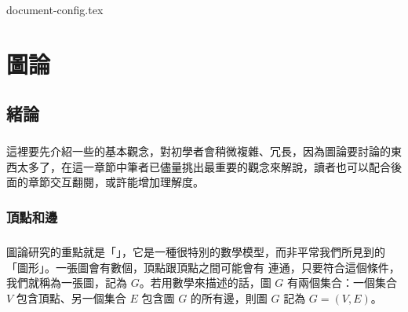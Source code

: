 \documentclass[12pt,a4paper,oneside]{report}
\begin{document}
\begin{CJK}{UTF8}{bkai}

{document-config.tex}

\fi

\providecommand*{\UEdge}[2]{\ensuremath{({#1},{#2})}}
\providecommand*{\DEdge}[2]{\ensuremath{\langle{}{{#1},{#2}}\rangle{}}}
\providecommand*{\Deg}[2][G]{\ensuremath{d_{#1}{(#2)}}}
\providecommand*{\OutDeg}[2][G]{\ensuremath{d^{+}_{#1}{(#2)}}}
\providecommand*{\InDeg}[2][G]{\ensuremath{d^{-}_{#1}{(#2)}}}

\label{tag:def_constant}
\newcommand*{\SelectedVertexStyle}{%
   \SetVertexNormal[
     MinSize=24pt,%
     LineWidth=1.5pt,%
     FillColor=black!20]}

\chapter{圖論}
\section{緒論}
\paragraph{}這裡要先介紹一些的基本觀念，對初學者會稍微複雜、冗長，因為圖論要討論的東西太多了，在這一章節中筆者已儘量挑出最重要的觀念來解說，讀者也可以配合後面的章節交互翻閱，或許能增加理解度。

\subsection{頂點和邊}
\paragraph{}圖論研究的重點就是「\textbf{}」，它是一種很特別的數學模型，而非平常我們所見到的「圖形」。一張圖會有數個\textbf{}，頂點跟頂點之間可能會有\textbf{} 連通，只要符合這個條件，我們就稱為一張圖，記為 $G$。若用數學來描述的話，圖 $G$ 有兩個集合：一個集合 $V$ 包含頂點、另一個集合 $E$ 包含圖 $G$ 的所有邊，則圖 $G$ 記為 $G=(V,E)$。

\end{CJK}
\end{document}
